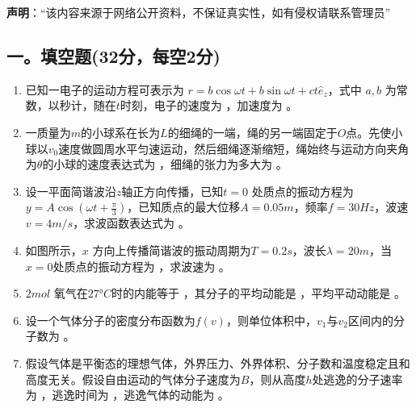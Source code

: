 
\textbf{声明}：“该内容来源于网络公开资料，不保证真实性，如有侵权请联系管理员”

\subsection{一。填空题(32分，每空2分)}
\begin{enumerate}
    \item 已知一电子的运动方程可表示为 $r = b \cos \omega t + b \sin \omega t + ct\hat{e}_z$，式中 $a,b$ 为常数，以秒计，随在$t$时刻，电子的速度为 \underline{\hspace{1cm}} ，加速度为 \underline{\hspace{1cm}} 。
    \item 一质量为$m$的小球系在长为$L$的细绳的一端，绳的另一端固定于$O$点。先使小球以$v_0$速度做圆周水平匀速运动，然后细绳逐渐缩短，绳始终与运动方向夹角为$\theta$的小球的速度表达式为 \underline{\hspace{1cm}} ，细绳的张力为多大为 \underline{\hspace{1cm}} 。
    \item 设一平面简谐波沿$z$轴正方向传播，已知$t = 0$ 处质点的振动方程为$y = A \cos (\omega t + \frac{\pi}{3})$，已知质点的最大位移$A=0.05m$，频率$f=30Hz$，波速$v=4m/s$，求波函数表达式为 \underline{\hspace{1cm}} 。
    \item 如图所示，$x$ 方向上传播简谐波的振动周期为$T = 0.2s$，波长$\lambda = 20m$，当$x = 0$处质点的振动方程为 \underline{\hspace{1cm}} ，求波速为 \underline{\hspace{1cm}} 。
    \item $2 mol$ 氧气在$27°C$时的内能等于 \underline{\hspace{1cm}} ，其分子的平均动能是 \underline{\hspace{1cm}} ，平均平动动能是 \underline{\hspace{1cm}} 。
    \item 设一个气体分子的密度分布函数为$f(v)$，则单位体积中，$v_1$与$v_2$区间内的分子数为 \underline{\hspace{1cm}} 。
    \item 假设气体是平衡态的理想气体，外界压力、外界体积、分子数和温度稳定且和高度无关。假设自由运动的气体分子速度为$B$，则从高度$h$处逃逸的分子速率为 \underline{\hspace{1cm}} ，逃逸时间为 \underline{\hspace{1cm}} ，逃逸气体的动能为 \underline{\hspace{1cm}} 。
\end{enumerate}
